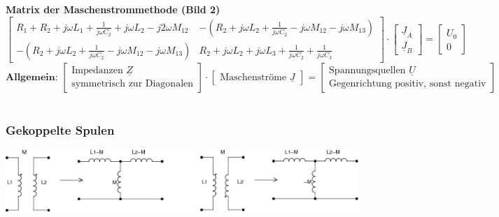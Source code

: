 \\ \\
\textbf{Matrix der Maschenstrommethode (Bild 2)}
$$\left[ \begin{array}{cc}
        R_1+R_2 +j \omega L_1 + \frac{1}{j \omega C_2} + j \omega L_2 - j 2
        \omega M_{12} 
    & -(R_2 + j \omega L_2 + \frac{1}{j \omega C_2} - j \omega M_{12} -
        j \omega M_{13}) \\
    -(R_2 + j \omega L_2 + \frac{1}{j \omega C_2} - j \omega M_{12} - j
        \omega M_{13})
    & R_2 + j \omega L_2 + j \omega L_3 + \frac{1}{j \omega C_2} +
        \frac{1}{j \omega C_3}
\end{array}\right] \cdot
\left[ \begin{array}{cc}
     \underline{J}_A \\ \underline{J}_B
     \end{array}\right] =
\left[ \begin{array}{cc}
     U_0 \\ 0
     \end{array}\right]$$
$$\textbf{Allgemein: }\left[ \begin{array}{cc}
       \text{Impedanzen $\underline{Z}$} \\
       \text{symmetrisch zur Diagonalen}
       \end{array}\right] \cdot \left[ \begin{array}{cc}
     \text{Maschenströme $\underline{J}$}
     \end{array}\right] =
\left[ \begin{array}{cc}
     \text{Spannungsquellen $\underline{U}$} \\
    \text{Gegenrichtung positiv, sonst negativ}
     \end{array}\right]$$\\

\subsubsection{Gekoppelte Spulen}
\begin{center}
\includegraphics[width=14cm]{./bilder/netzwerkanalyse-kopplung-spulen.png}
\end{center}

